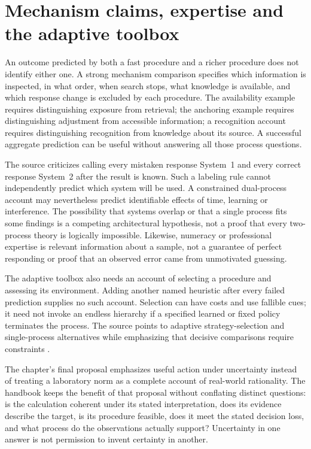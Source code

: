 \section{Mechanism claims, expertise and the adaptive toolbox}
\label{sec:p19-r24-mechanisms}

An outcome predicted by both a fast procedure and a richer
procedure does not identify either one. A strong mechanism
comparison specifies which information is inspected, in what
order, when search stops, what knowledge is available, and
which response change is excluded by each procedure. The
availability example requires distinguishing exposure from
retrieval; the anchoring example requires distinguishing
adjustment from accessible information; a recognition account
requires distinguishing recognition from knowledge about its
source. A successful aggregate prediction can be useful without
answering all those process questions.

The source criticizes calling every mistaken response System~1
and every correct response System~2 after the result is known.
Such a labeling rule cannot independently predict which system
will be used. A constrained dual-process account may nevertheless
predict identifiable effects of time, learning or interference.
The possibility that systems overlap or that a single process
fits some findings is a competing architectural hypothesis,
not a proof that every two-process theory is logically impossible.
Likewise, numeracy or professional expertise is relevant information
about a sample, not a guarantee of perfect responding or proof
that an observed error came from unmotivated guessing.

The adaptive toolbox also needs an account of selecting a
procedure and assessing its environment. Adding another named
heuristic after every failed prediction supplies no such account.
Selection can have costs and use fallible cues; it need not
invoke an endless hierarchy if a specified learned or fixed
policy terminates the process. The source points to adaptive
strategy-selection and single-process alternatives while
emphasizing that decisive comparisons require constraints
\cite[pp.~166--168]{FiedlerPragerMcCaughey2021Heuristics}.

The chapter's final proposal emphasizes useful action under
uncertainty instead of treating a laboratory norm as a complete
account of real-world rationality. The handbook keeps the
benefit of that proposal without conflating distinct questions:
is the calculation coherent under its stated interpretation,
does its evidence describe the target, is its procedure feasible,
does it meet the stated decision loss, and what process do the
observations actually support? Uncertainty in one answer is
not permission to invent certainty in another.
